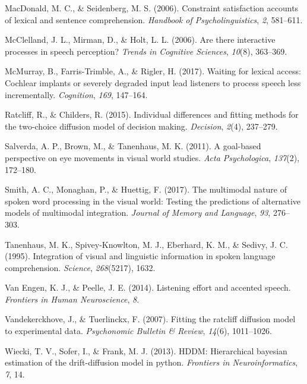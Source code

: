 \documentclass[10pt, letterpaper]{article}
\begin{document}
\hypertarget{ref-macdonald2006constraint}{}
MacDonald, M. C., \& Seidenberg, M. S. (2006). Constraint satisfaction
accounts of lexical and sentence comprehension. \emph{Handbook of
Psycholinguistics}, \emph{2}, 581--611.

\hypertarget{ref-mcclelland2006there}{}
McClelland, J. L., Mirman, D., \& Holt, L. L. (2006). Are there
interactive processes in speech perception? \emph{Trends in Cognitive
Sciences}, \emph{10}(8), 363--369.

\hypertarget{ref-mcmurray2017waiting}{}
McMurray, B., Farris-Trimble, A., \& Rigler, H. (2017). Waiting for
lexical access: Cochlear implants or severely degraded input lead
listeners to process speech less incrementally. \emph{Cognition},
\emph{169}, 147--164.

\hypertarget{ref-ratcliff2015individual}{}
Ratcliff, R., \& Childers, R. (2015). Individual differences and fitting
methods for the two-choice diffusion model of decision making.
\emph{Decision}, \emph{2}(4), 237--279.

\hypertarget{ref-salverda2011goal}{}
Salverda, A. P., Brown, M., \& Tanenhaus, M. K. (2011). A goal-based
perspective on eye movements in visual world studies. \emph{Acta
Psychologica}, \emph{137}(2), 172--180.

\hypertarget{ref-smith2017multimodal}{}
Smith, A. C., Monaghan, P., \& Huettig, F. (2017). The multimodal nature
of spoken word processing in the visual world: Testing the predictions
of alternative models of multimodal integration. \emph{Journal of Memory
and Language}, \emph{93}, 276--303.

\hypertarget{ref-tanenhaus1995integration}{}
Tanenhaus, M. K., Spivey-Knowlton, M. J., Eberhard, K. M., \& Sedivy, J.
C. (1995). Integration of visual and linguistic information in spoken
language comprehension. \emph{Science}, \emph{268}(5217), 1632.

\hypertarget{ref-van2014listening}{}
Van Engen, K. J., \& Peelle, J. E. (2014). Listening effort and accented
speech. \emph{Frontiers in Human Neuroscience}, \emph{8}.

\hypertarget{ref-vandekerckhove2007fitting}{}
Vandekerckhove, J., \& Tuerlinckx, F. (2007). Fitting the ratcliff
diffusion model to experimental data. \emph{Psychonomic Bulletin \&
Review}, \emph{14}(6), 1011--1026.

\hypertarget{ref-wiecki2013hddm}{}
Wiecki, T. V., Sofer, I., \& Frank, M. J. (2013). HDDM: Hierarchical
bayesian estimation of the drift-diffusion model in python.
\emph{Frontiers in Neuroinformatics}, \emph{7}, 14.
\end{document}
